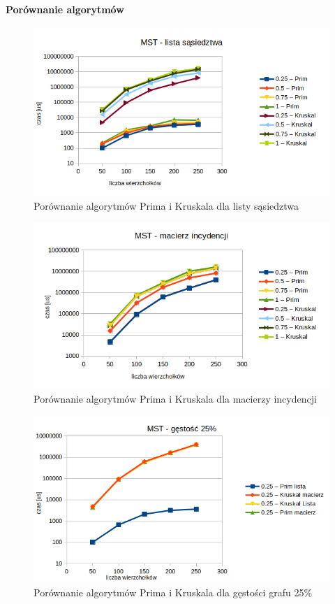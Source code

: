 \documentclass[11pt]{article}
\begin{document}
\paragraph{Porównanie algorytmów}

\begin{figure}[H]
    \includegraphics[width=13cm]{images/mstlista.png}
    \caption{ Porównanie algorytmów Prima i Kruskala dla listy sąsiedztwa}
\end{figure}

\begin{figure}[H]
    \includegraphics[width=13cm]{images/mstmacierz.png}
    \caption{ Porównanie algorytmów Prima i Kruskala dla macierzy incydencji}
\end{figure}

\begin{figure}[H]
    \includegraphics[width=13cm]{images/mst25.png}
    \caption{ Porównanie algorytmów Prima i Kruskala dla gęstości grafu 25\%}
\end{figure}
\end{document}
